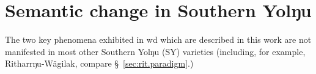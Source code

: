 %	
%




\fi


\section{Semantic change in Southern Yolŋu}
\label{yol-change}

The two key phenomena exhibited in \gls{wd} which are described in this work are not manifested in most other Southern Yolŋu (SY) varieties (including, for example, Ritharrŋu-Wägilak, compare \S~\ref{sec:rit.paradigm}.)


